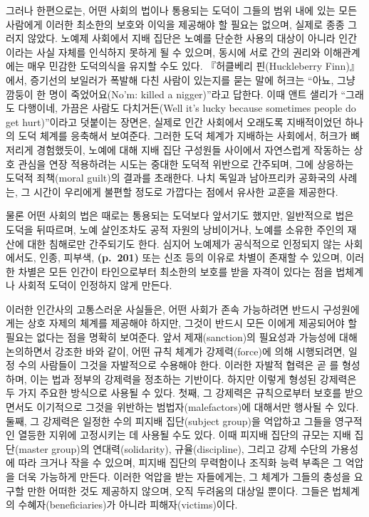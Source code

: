 그러나 한편으로는, 어떤 사회의 법이나 통용되는 도덕이 그들의 범위 내에
있는 모든 사람에게 이러한 최소한의 보호와 이익을 제공해야 할 필요는
없으며, 실제로 종종 그러지 않았다. 노예제 사회에서 지배 집단은 노예를
단순한 사용의 대상이 아니라 인간이라는 사실 자체를 인식하지 못하게 될 수
있으며, 동시에 서로 간의 권리와 이해관계에는 매우 민감한 도덕의식을
유지할 수도 있다. 『허클베리 핀(Huckleberry Finn)』에서, 증기선의
보일러가 폭발해 다친 사람이 있는지를 묻는 말에 허크는 ``아뇨, 그냥
깜둥이 한 명이 죽었어요(No'm: killed a nigger)''라고 답한다. 이때 앤트
샐리가 ``그래도 다행이네, 가끔은 사람도 다치거든(Well it's lucky because
sometimes people do get hurt)''이라고 덧붙이는 장면은, 실제로 인간
사회에서 오래도록 지배적이었던 하나의 도덕 체계를 응축해서 보여준다.
그러한 도덕 체계가 지배하는 사회에서, 허크가 뼈저리게 경험했듯이, 노예에
대해 지배 집단 구성원들 사이에서 자연스럽게 작동하는 상호 관심을 연장
적용하려는 시도는 중대한 도덕적 위반으로 간주되며, 그에 상응하는 도덕적
죄책(moral guilt)의 결과를 초래한다. 나치 독일과 남아프리카 공화국의
사례는, 그 시간이 우리에게 불편할 정도로 가깝다는 점에서 유사한 교훈을
제공한다.

물론 어떤 사회의 법은 때로는 통용되는 도덕보다 앞서기도 했지만,
일반적으로 법은 도덕을 뒤따르며, 노예 살인조차도 공적 자원의 낭비이거나,
노예를 소유한 주인의 재산에 대한 침해로만 간주되기도 한다. 심지어
노예제가 공식적으로 인정되지 않는 사회에서도, 인종, 피부색,
\textbf{(p.~201)} 또는 신조 등의 이유로 차별이 존재할 수 있으며, 이러한
차별은 모든 인간이 타인으로부터 최소한의 보호를 받을 자격이 있다는 점을
법체계나 사회적 도덕이 인정하지 않게 만든다.

이러한 인간사의 고통스러운 사실들은, 어떤 사회가 존속 가능하려면 반드시
 구성원에게는 상호 자제의 체계를 제공해야 하지만, 그것이
반드시 모든 이에게 제공되어야 할 필요는 없다는 점을 명확히 보여준다.
앞서 제재(sanction)의 필요성과 가능성에 대해 논의하면서 강조한 바와
같이, 어떤 규칙 체계가 강제력(force)에 의해 시행되려면, 일정 수의
사람들이 그것을 자발적으로 수용해야 한다. 이러한 자발적 협력은 곧
를 형성하며, 이는 법과 정부의 강제력을 정초하는
기반이다. 하지만 이렇게 형성된 강제력은 두 가지 주요한 방식으로 사용될
수 있다. 첫째, 그 강제력은 규칙으로부터 보호를 받으면서도 이기적으로
그것을 위반하는 범법자(malefactors)에 대해서만 행사될 수 있다. 둘째, 그
강제력은 일정한 수의 피지배 집단(subject group)을 억압하고 그들을
영구적인 열등한 지위에 고정시키는 데 사용될 수도 있다. 이때 피지배
집단의 규모는 지배 집단(master group)의 연대력(solidarity),
규율(discipline), 그리고 강제 수단의 가용성에 따라 크거나 작을 수
있으며, 피지배 집단의 무력함이나 조직화 능력 부족은 그 억압을 더욱
가능하게 만든다. 이러한 억압을 받는 자들에게는, 그 체계가 그들의 충성을
요구할 만한 어떠한 것도 제공하지 않으며, 오직 두려움의 대상일 뿐이다.
그들은 법체계의 수혜자(beneficiaries)가 아니라 피해자(victims)이다.

